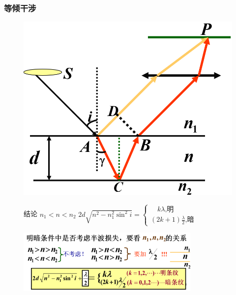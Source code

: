 \documentclass[UTF8]{ctexbeamer}
\begin{document}
\begin{frame}
\frametitle{等倾干涉}
\begin{figure}
	\begin{minipage}{0.39\textwidth}
			\centering
			\includegraphics[width=1\textwidth]{15}
	\end{minipage}
	\begin{minipage}{0.59\textwidth}
		\begin{block}{结论}
			$ n_1<n<n_2$
			$2d\sqrt{n^2-n_1^2\sin^2i}=\begin{cases}\quad k\lambda\text{,明}\\(2k+1)\frac\lambda2\text{,暗}\end{cases} $
		\end{block}
	\end{minipage}
\end{figure}
\begin{figure}[!ht]
	\centering
	\includegraphics[width=0.8\textwidth]{16}
\end{figure}
\end{frame}
\end{document}
